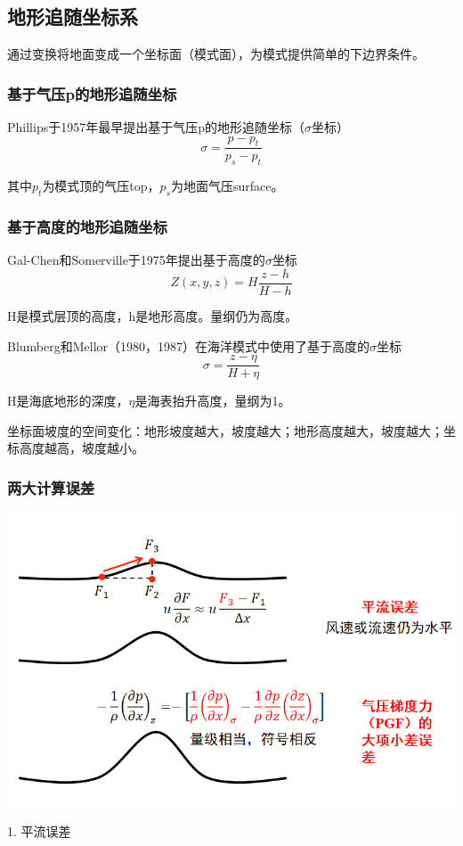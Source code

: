 \documentclass{article}
\begin{document}
\subsection{地形追随坐标系}
通过变换将地面变成一个坐标面（模式面），为模式提供简单的下边界条件。
\subsubsection{基于气压p的地形追随坐标}
Phillips于1957年最早提出基于气压p的地形追随坐标（$\sigma$坐标）
$$\sigma = \frac{p-p_t}{p_s-p_t}$$

其中$p_t$为模式顶的气压top，$p_s$为地面气压surface。

\subsubsection{基于高度的地形追随坐标}
Gal-Chen和Somerville于1975年提出基于高度的$\sigma$坐标
$$Z(x,y,z) = H\frac{z-h}{H-h}$$

H是模式层顶的高度，h是地形高度。量纲仍为高度。

Blumberg和Mellor（1980，1987）在海洋模式中使用了基于高度的$\sigma$坐标
$$\sigma = \frac{z-\eta}{H+\eta}$$

H是海底地形的深度，$\eta$是海表抬升高度，量纲为1。

坐标面坡度的空间变化：地形坡度越大，坡度越大；地形高度越大，坡度越大；坐标高度越高，坡度越小。

\subsubsection{两大计算误差}
\begin{center}
        \includegraphics[width=0.8\linewidth]{Fig4_1.png}
\end{center}

1. 平流误差
\end{document}
